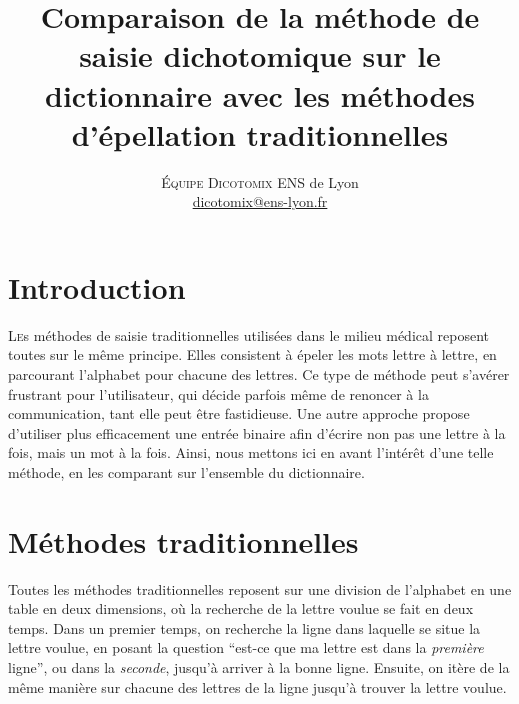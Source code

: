 \documentclass[twoside,twocolumn]{article}
\title{Comparaison de la méthode de saisie dichotomique sur le dictionnaire avec les méthodes d'épellation traditionnelles} %
\author{%
\textsc{Équipe Dicotomix}
\normalsize ENS de Lyon \\ %
\normalsize \href{mailto:dicotomix@ens-lyon.fr}{dicotomix@ens-lyon.fr} %
}
\date{} %
\begin{document}
\maketitle


\section{Introduction}

\lettrine[nindent=0em,lines=3]{L}es méthodes de saisie traditionnelles utilisées dans le milieu médical reposent toutes sur le même principe. Elles consistent à épeler les mots lettre à lettre, en parcourant l'alphabet pour chacune des lettres. Ce type de méthode peut s'avérer frustrant pour l'utilisateur, qui décide parfois même de renoncer à la communication, tant elle peut être fastidieuse. Une autre approche propose d'utiliser plus efficacement une entrée binaire afin d'écrire non pas une lettre à la fois, mais un mot à la fois. Ainsi, nous mettons ici en avant l'intérêt d'une telle méthode, en les comparant sur l'ensemble du dictionnaire.


\section{Méthodes traditionnelles}

Toutes les méthodes traditionnelles reposent sur une division de l'alphabet en une table en deux dimensions, où la recherche de la lettre voulue se fait en deux temps. Dans un premier temps, on recherche la ligne dans laquelle se situe la lettre voulue, en posant la question ``est-ce que ma lettre est dans la \textit{première} ligne'', ou dans la \textit{seconde}, jusqu'à arriver à la bonne ligne. Ensuite, on itère de la même manière sur chacune des lettres de la ligne jusqu'à trouver la lettre voulue.
\end{document}
